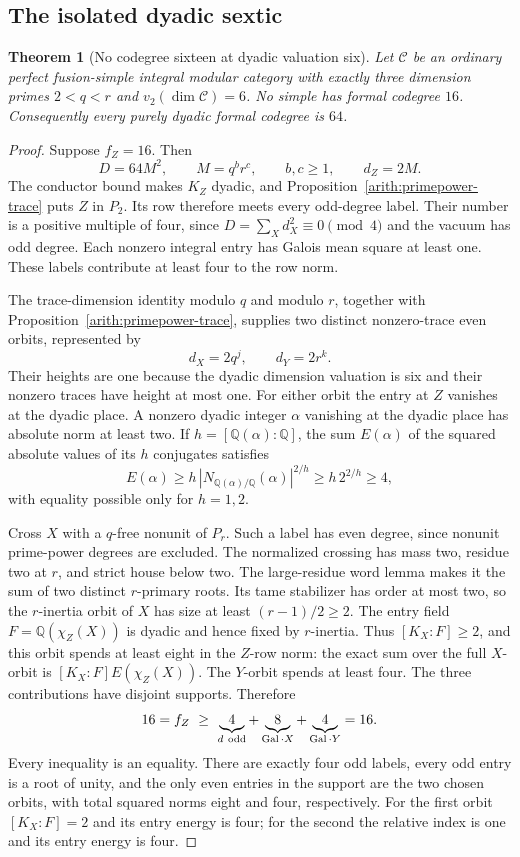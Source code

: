 \documentclass[11pt,a4paper]{article}
\numberwithin{equation}{section}
\newtheorem{theorem}{Theorem}[section]
\newcommand{\QQ}{\mathbb Q}
\begin{document}
\subsection{The isolated dyadic sextic}

\begin{theorem}[No codegree sixteen at dyadic valuation six]
\label{red:codegree-sixteen}
Let $\mathcal C$ be an ordinary perfect fusion-simple integral
modular category with exactly three dimension primes
$2<q<r$ and $v_2(\dim\mathcal C)=6$. No simple has formal
codegree $16$. Consequently every purely dyadic formal
codegree is $64$.
\end{theorem}
\begin{proof}
Suppose $f_Z=16$. Then
\[
 D=64M^2,\qquad M=q^b r^c,\qquad b,c\ge1,
 \qquad d_Z=2M.
\]
The conductor bound makes $K_Z$ dyadic, and
Proposition~\ref{arith:primepower-trace} puts $Z$ in $P_2$.
Its row therefore meets every odd-degree label. Their number
is a positive multiple of four, since $D=\sum_Xd_X^2\equiv0\pmod4$
and the vacuum has odd degree. Each nonzero integral entry has
Galois mean square at least one. These labels contribute at least
four to the row norm.

The trace-dimension identity modulo $q$ and modulo $r$,
together with Proposition~\ref{arith:primepower-trace}, supplies
two distinct nonzero-trace even orbits, represented by
\[
                   d_X=2q^j,\qquad d_Y=2r^k.
\]
Their heights are one because the dyadic dimension valuation
is six and their nonzero traces have height at most one.
For either orbit the entry at $Z$ vanishes at the dyadic
place. A nonzero dyadic integer $\alpha$ vanishing at the dyadic place
has absolute norm at least two. If $h=[\QQ(\alpha):\QQ]$, the sum $E(\alpha)$
of the squared absolute values of its $h$ conjugates satisfies
\[
 E(\alpha)\ge h\,|N_{\QQ(\alpha)/\QQ}(\alpha)|^{2/h}
             \ge h\,2^{2/h}\ge4,
\]
with equality possible only for $h=1,2$.

Cross $X$ with a $q$-free nonunit of $P_r$. Such a label
has even degree, since nonunit prime-power degrees are
excluded. The normalized crossing has mass two, residue
two at $r$, and strict house below two. The large-residue
word lemma makes it the sum of two distinct $r$-primary
roots. Its tame stabilizer has order at most two, so the
$r$-inertia orbit of $X$ has size at least $(r-1)/2\ge2$.
The entry field $F=\mathbb Q(\chi_Z(X))$ is dyadic and hence
fixed by $r$-inertia. Thus $[K_X:F]\ge2$, and this orbit
spends at least eight in the $Z$-row norm: the exact sum
over the full $X$-orbit is
$[K_X:F]E(\chi_Z(X))$. The $Y$-orbit
spends at least four. The three contributions have disjoint supports. Therefore
\[
 16=f_Z\ \ge\
 \underbrace{4}_{d\ {\rm odd}}+
 \underbrace{8}_{\operatorname{Gal}\cdot X}+
 \underbrace{4}_{\operatorname{Gal}\cdot Y}=16 .
\]
Every inequality is an equality. There are exactly four
odd labels, every odd entry is a root of unity, and the only
even entries in the support are the two chosen orbits,
with total squared norms eight and four, respectively.
For the first orbit $[K_X:F]=2$ and its entry energy is four;
for the second the relative index is one and its entry
energy is four.


\end{proof}
\end{document}
